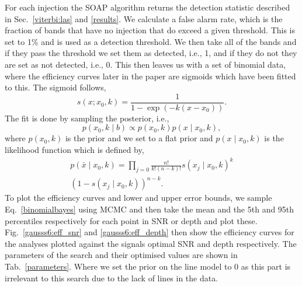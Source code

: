 %
%
For each injection the SOAP algorithm returns the detection statistic described in Sec.~\ref{viterbi:las} and \ref{results}.
We calculate a false alarm rate, which is the fraction of bands that have no injection that do exceed a given threshold. This is set to 1\% and is used as a detection threshold.
We then take all of the bands and if they pass the threshold we set them as detected, i.e., 1, and if they do not they are set as not detected, i.e., 0.
This then leaves us with a set of binomial data, where the efficiency curves later in the paper are sigmoids which have been fitted to this.
The sigmoid follows,
\begin{equation}
s(x; x_0, k)  = \frac{1}{1-\exp{(-k(x - x_0))}}.
\end{equation}
The fit is done by sampling the posterior, i.e.,
\begin{equation}
\label{binomialbayes}
p(x_0, k \mid b) \propto  p(x_0,k)p(x \mid x_0, k),
\end{equation}
where $p(x_0,k)$ is the prior and we set to a flat prior and $p(x \mid x_0, k)$ is the likelihood function which is defined by,
\begin{equation}
\begin{split}
p(\bar{x} \mid x_0, k) = \prod_{j=0}\frac{n!}{k!(n-k)!}s(x_j \mid x_0, k)^{k} \\ (1-s(x_j \mid x_0,k))^{n-k}.
\end{split}
\end{equation}
To plot the efficiency curves and lower and upper error bounds, we sample Eq.~\ref{binomialbayes} using \ac{MCMC} and then take the mean and the 5th and 95th percentiles respectively for each point in SNR or depth and plot these.
Fig.~\ref{gausss6:eff_snr} and  \ref{gausss6:eff_depth} then show the efficiency curves for the analyses plotted against the signals optimal \ac{SNR} and depth respectively.
The parameters of the search and their optimised values are shown in Tab.~\ref{parameters}. Where we set the prior on the line model to 0 as this part is irrelevant to this search due to the lack of lines in the data.


